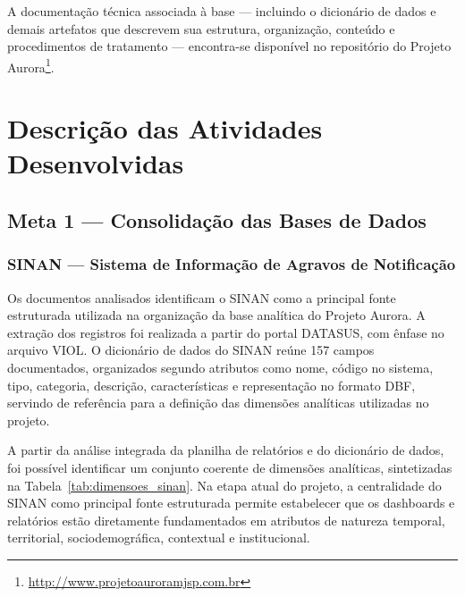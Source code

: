\documentclass[11pt,a4paper]{article}
\begin{document}
A documentação técnica associada à base — incluindo o dicionário de dados e demais artefatos que descrevem sua estrutura, organização, conteúdo e procedimentos de tratamento — encontra-se disponível no repositório do Projeto Aurora\footnote{\label{fn:portal}\url{http://www.projetoauroramjsp.com.br}}.

\clearpage
\section{Descrição das Atividades Desenvolvidas}
\label{sec:atividades}

\subsection{Meta 1 — Consolidação das Bases de Dados}
\label{subsec:atividades_meta1}

\subsubsection{SINAN — Sistema de Informação de Agravos de Notificação}
\label{subsubsec:sinan_atividade}

Os documentos analisados identificam o SINAN como a principal fonte estruturada utilizada na organização da base analítica do Projeto Aurora. A extração dos registros foi realizada a partir do portal DATASUS, com ênfase no arquivo VIOL. O dicionário de dados do SINAN reúne 157 campos documentados, organizados segundo atributos como nome, código no sistema, tipo, categoria, descrição, características e representação no formato DBF, servindo de referência para a definição das dimensões analíticas utilizadas no projeto.

A partir da análise integrada da planilha de relatórios e do dicionário de dados, foi possível identificar um conjunto coerente de dimensões analíticas, sintetizadas na Tabela~\ref{tab:dimensoes_sinan}. Na etapa atual do projeto, a centralidade do SINAN como principal fonte estruturada permite estabelecer que os dashboards e relatórios estão diretamente fundamentados em atributos de natureza temporal, territorial, sociodemográfica, contextual e institucional.
\end{document}
